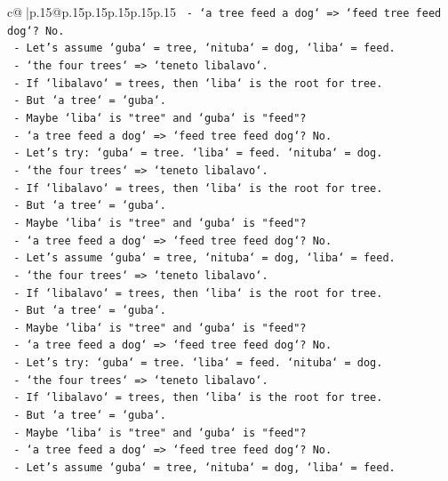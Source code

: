 \documentclass{article}
\begin{document}
{\begin{supertabular}{c@{$\;$}|p{.15\linewidth}@{}p{.15\linewidth}p{.15\linewidth}p{.15\linewidth}p{.15\linewidth}p{.15\linewidth}}
{{{\texttt{  {-} `a tree feed a dog` => `feed tree feed dog`? No.} \\
\texttt{  {-} Let's assume `guba` = tree, `nituba` = dog, `liba` = feed.} \\
\texttt{  {-} `the four trees` => `teneto libalavo`.} \\
\texttt{  {-} If `libalavo` = trees, then `liba` is the root for tree.} \\
\texttt{  {-} But `a tree` = `guba`.} \\
\texttt{  {-} Maybe `liba` is "tree" and `guba` is "feed"?} \\
\texttt{  {-} `a tree feed a dog` => `feed tree feed dog`? No.} \\
\texttt{  {-} Let's try: `guba` = tree. `liba` = feed. `nituba` = dog.} \\
\texttt{  {-} `the four trees` => `teneto libalavo`.} \\
\texttt{  {-} If `libalavo` = trees, then `liba` is the root for tree.} \\
\texttt{  {-} But `a tree` = `guba`.} \\
\texttt{  {-} Maybe `liba` is "tree" and `guba` is "feed"?} \\
\texttt{  {-} `a tree feed a dog` => `feed tree feed dog`? No.} \\
\texttt{  {-} Let's assume `guba` = tree, `nituba` = dog, `liba` = feed.} \\
\texttt{  {-} `the four trees` => `teneto libalavo`.} \\
\texttt{  {-} If `libalavo` = trees, then `liba` is the root for tree.} \\
\texttt{  {-} But `a tree` = `guba`.} \\
\texttt{  {-} Maybe `liba` is "tree" and `guba` is "feed"?} \\
\texttt{  {-} `a tree feed a dog` => `feed tree feed dog`? No.} \\
\texttt{  {-} Let's try: `guba` = tree. `liba` = feed. `nituba` = dog.} \\
\texttt{  {-} `the four trees` => `teneto libalavo`.} \\
\texttt{  {-} If `libalavo` = trees, then `liba` is the root for tree.} \\
\texttt{  {-} But `a tree` = `guba`.} \\
\texttt{  {-} Maybe `liba` is "tree" and `guba` is "feed"?} \\
\texttt{  {-} `a tree feed a dog` => `feed tree feed dog`? No.} \\
\texttt{  {-} Let's assume `guba` = tree, `nituba` = dog, `liba` = feed.} \\
}}}
\end{supertabular}}
\end{document}
